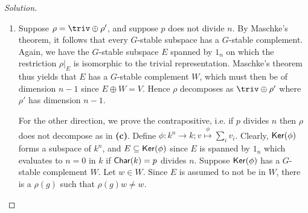 \begin{proof}[Solution]
\begin{enumerate}[font=\normalfont,label=\textbf{(\alph*)}, wide]
\item Suppose $\rho = \triv \oplus \rho'$, and suppose $p$ does not divide $n$. By Maschke's theorem, it follows that every $G$-stable subspace has a $G$-stable complement. Again, we have the $G$-stable subspace $E$ spanned by $1_n$ on which the restriction $\rho|_E$ is isomorphic to the trivial representation. Maschke's theorem thus yields that $E$ has a $G$-stable complement $W$, which must then be of dimension $n-1$ since $E \oplus W = V$. Hence $\rho$ decomposes as $\triv \oplus \rho'$ where $\rho'$ has dimension $n-1$.

For the other direction, we prove the contrapositive, i.e. if $p$ divides $n$ then $\rho$ does not decompose as in \textbf{(c)}. Define $\phi: k^n \to k; v \overset{\phi}{\mapsto} \sum_i v_i$. Clearly, $\mathsf{Ker}(\phi)$ forms a subspace of $k^n$, and $E \subseteq \mathsf{Ker}(\phi)$ since $E$ is spanned by $1_n$ which evaluates to $n = 0$ in $k$ if $\mathsf{Char}(k) = p$ divides $n$. Suppose $\mathsf{Ker}(\phi)$ has a $G$-stable complement $W$. Let $w \in W$. Since $E$ is assumed to not be in $W$, there is a $\rho(g)$ such that $\rho(g)w \neq w$.

\end{enumerate}
\end{proof}

\newpage



